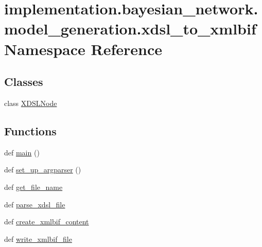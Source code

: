 \hypertarget{namespaceimplementation_1_1bayesian__network_1_1model__generation_1_1xdsl__to__xmlbif}{}\section{implementation.\+bayesian\+\_\+network.\+model\+\_\+generation.\+xdsl\+\_\+to\+\_\+xmlbif Namespace Reference}
\label{namespaceimplementation_1_1bayesian__network_1_1model__generation_1_1xdsl__to__xmlbif}
\subsection*{Classes}
\begin{DoxyCompactItemize}
\item 
class \hyperlink{classimplementation_1_1bayesian__network_1_1model__generation_1_1xdsl__to__xmlbif_1_1_x_d_s_l_node}{X\+D\+S\+L\+Node}
\end{DoxyCompactItemize}
\subsection*{Functions}
\begin{DoxyCompactItemize}
\item 
def \hyperlink{namespaceimplementation_1_1bayesian__network_1_1model__generation_1_1xdsl__to__xmlbif_aaf0562d9274dd80861383ae48266df02}{main} ()
\item 
def \hyperlink{namespaceimplementation_1_1bayesian__network_1_1model__generation_1_1xdsl__to__xmlbif_aaf8e84cde15d566880194dae24eb6768}{set\+\_\+up\+\_\+argparser} ()
\item 
def \hyperlink{namespaceimplementation_1_1bayesian__network_1_1model__generation_1_1xdsl__to__xmlbif_a1d8ffb941376f80a06cacd42ae6512e3}{get\+\_\+file\+\_\+name}
\item 
def \hyperlink{namespaceimplementation_1_1bayesian__network_1_1model__generation_1_1xdsl__to__xmlbif_a6115ffc29c171860fcd95ddc215ab092}{parse\+\_\+xdsl\+\_\+file}
\item 
def \hyperlink{namespaceimplementation_1_1bayesian__network_1_1model__generation_1_1xdsl__to__xmlbif_a8347bb210d032296b7df637666725fae}{create\+\_\+xmlbif\+\_\+content}
\item 
def \hyperlink{namespaceimplementation_1_1bayesian__network_1_1model__generation_1_1xdsl__to__xmlbif_a1a2f2a44f27d6e032ffc2d9ba63f7648}{write\+\_\+xmlbif\+\_\+file}
\end{DoxyCompactItemize}

